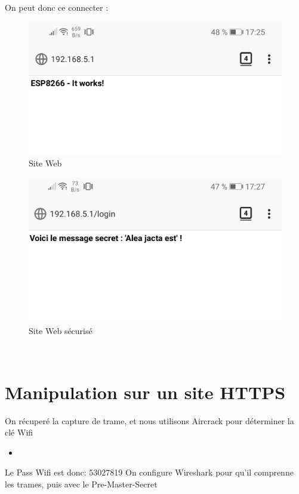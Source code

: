 \documentclass[10pt,a4paper]{article}
\newcommand{\insertcode}[2]{\begin{itemize}\item[]\end{itemize}}
\begin{document}
On peut donc ce connecter :
\begin{figure}[h!]
\centering
\includegraphics[scale=0.250]{image/11.jpg}
\caption{Site Web}
\label{fig:net }
\end{figure}
\begin{figure}[h!]
\centering
\includegraphics[scale=0.250]{image/10.jpg}
\caption{Site Web sécurisé}
\label{fig:net }
\end{figure}\\
\newpage
\section{Manipulation sur un site HTTPS}
On récuperé la capture de trame, et nous utilisons Aircrack pour déterminer la clé Wifi
\insertcode{https/aircrack}{Clé wifi}
Le Pass Wifi est donc: 53027819
On configure Wireshark pour qu'il comprenne les trames, puis avec le Pre-Master-Secret
\end{document}
